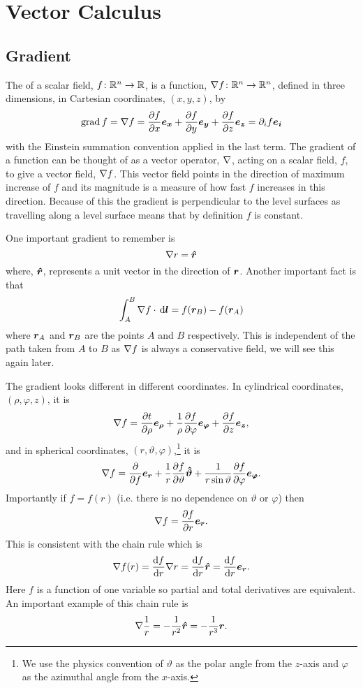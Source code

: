 \section{Vector Calculus}
    \subsection{Gradient}
    The  of a scalar field, \(f\colon\mathbb{R}^n\to\mathbb{R}\), is a function, \(\nabla f\colon\mathbb{R}^n\to\mathbb{R}^n\), defined in three dimensions, in Cartesian coordinates, \((x, y, z)\), by
    \[\operatorname{grad}f = \nabla f =  \pdv{f}{x}\bm{e_{x}} + \pdv{f}{y}\bm{e_{y}} + \pdv{f}{z}\bm{e_{z}} = \partial_i f\bm{e_{i}}\]
    with the Einstein summation convention applied in the last term.
    The gradient of a function can be thought of as a vector operator, \(\nabla\), acting on a scalar field, \(f\), to give a vector field, \(\nabla f\).
    This vector field points in the direction of maximum increase of \(f\) and its magnitude is a measure of how fast \(f\) increases in this direction.
    Because of this the gradient is perpendicular to the level surfaces as travelling along a level surface means that by definition \(f\) is constant.
    
    One important gradient to remember is
    \[\nabla r = \bm{\hat{r}}\]
    where, \(\bm{\hat{r}}\), represents a unit vector in the direction of \(\bm{r}\).
    Another important fact is that
    \[\int_A^B \nabla f \cdot\,\dd\bm{l} = f(\bm{r}_B) - f(\bm{r}_A)\]
    where \(\bm{r}_A\) and \(\bm{r}_B\) are the points \(A\) and \(B\) respectively.
    This is independent of the path taken from \(A\) to \(B\) as \(\nabla f\) is always a conservative field, we will see this again later.
    
    The gradient looks different in different coordinates.
    In cylindrical coordinates, \((\rho, \varphi, z)\), it is
    \[\nabla f = \pdv{t}{\rho}\bm{e_{\rho}} + \frac{1}{\rho}\pdv{f}{\varphi}\bm{e_{\varphi}} + \pdv{f}{z}\bm{e_{z}},\]
    and in spherical coordinates, \((r, \vartheta, \varphi)\),\footnote{We use the physics convention of \(\vartheta\) as the polar angle from the \(z\)-axis and \(\varphi\) as the azimuthal angle from the \(x\)-axis.} it is
    \[\nabla f = \pdv{f}\bm{e_{r}} + \frac{1}{r}\pdv{f}{\vartheta}\bm{\hat{\vartheta}} + \frac{1}{r\sin\vartheta}\pdv{f}{\varphi}\bm{e_{\varphi}}.\]
    Importantly if \(f = f(r)\) (i.e. there is no dependence on \(\vartheta\) or \(\varphi\)) then
    \[\nabla f = \pdv{f}{r}\bm{e_{r}}.\]
    This is consistent with the chain rule which is
    \[\nabla f(r) = \dv{f}{r}\nabla{r} = \dv{f}{r}\bm{\hat{r}} = \dv{f}{r}\bm{e_{r}}.\]
    Here \(f\) is a function of one variable so partial and total derivatives are equivalent.
    An important example of this chain rule is
    \[\nabla\frac{1}{r} = -\frac{1}{r^2}\bm{\hat{r}} = -\frac{1}{r^3}\bm{r}.\]
    
